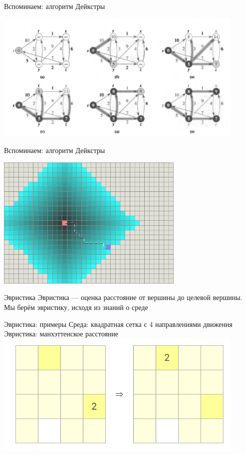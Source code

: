 \documentclass[10pt]{beamer}
\begin{document}
\begin{frame}[fragile]{Вспоминаем: алгоритм Дейкстры}
\begin{center}
    \includegraphics[width=12cm]{Term_2/Source/images/dijkstra.png}
\end{center}
\end{frame}

\begin{frame}[fragile]{Вспоминаем: алгоритм Дейкстры}
\begin{center}
\includegraphics[width=9cm]{Term_2/Source/images/dijkstra-new.png}
\end{center}
\end{frame}

\begin{frame}[fragile]{Эвристика}
Эвристика — оценка расстояние от вершины до целевой вершины.\\
Мы берём эвристику, исходя из знаний о среде
\end{frame}

\begin{frame}[fragile]{Эвристика: примеры}
Среда: квадратная сетка с 4 направлениями движения\\
Эвристика: манхэттенское расстояние
\includegraphics[width=12cm]{Term_2/Source/images/manhattan.png}
\end{frame}
\end{document}
